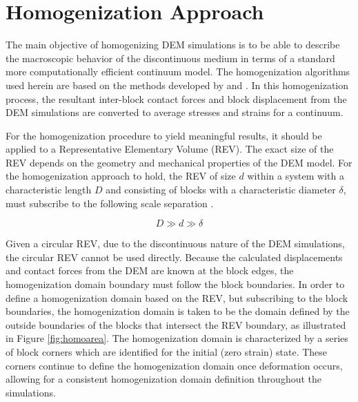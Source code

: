 \section{Homogenization Approach}

The main objective of homogenizing DEM simulations is to be able to describe the macroscopic behavior of the discontinuous medium in terms of a standard more computationally efficient continuum model. The homogenization algorithms used herein are based on the methods developed by \citet{daddetta_particle_2004} and \citet{wellmann_homogenization_2008}. In this homogenization process, the resultant inter-block contact forces and block displacement from the DEM simulations are converted to average stresses and strains for a continuum.

For the homogenization procedure to yield meaningful results, it should be applied to a Representative Elementary Volume (REV). The exact size of the REV depends on the geometry and mechanical properties of the DEM model. For the homogenization approach to hold, the REV of size $d$ within a system with a characteristic length $D$ and consisting of blocks with a characteristic diameter $\delta$, must subscribe to the following scale separation \citep{wellmann_homogenization_2008}. 

\begin{equation}
D\gg d\gg\delta\label{eqn:hom1a}
\end{equation}

Given a circular REV, due to the discontinuous nature of the DEM simulations, the circular REV cannot be used directly. Because the calculated displacements and contact forces from the DEM are known at the block edges, the homogenization domain boundary must follow the block boundaries. In order to define a homogenization domain based on the REV, but subscribing to the block boundaries, the homogenization domain is taken to be the domain defined by the outside boundaries of the blocks that intersect the REV boundary, as illustrated in Figure \ref{fig:homoarea}. The homogenization domain is characterized by a series of block corners which are identified for the initial (zero strain) state. These corners continue to define the homogenization domain once deformation occurs, allowing for a consistent homogenization domain definition throughout the simulations. 

